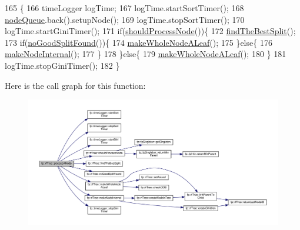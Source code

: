 \begin{DoxyCode}
165                                           \{
166                     timeLogger logTime;
167                     logTime.startSortTimer();
168                     \hyperlink{classfp_1_1rfTree_af72d0a2f930fd480dfb4858885c2df23}{nodeQueue}.back().setupNode();
169                     logTime.stopSortTimer();
170                     logTime.startGiniTimer();
171                     \textcolor{keywordflow}{if}(\hyperlink{classfp_1_1rfTree_a36abf82d31ca57670b09da16525dce0d}{shouldProcessNode}())\{
172                         \hyperlink{classfp_1_1rfTree_a51da8e4a46582b26643a4ae392230e77}{findTheBestSplit}();
173                         \textcolor{keywordflow}{if}(\hyperlink{classfp_1_1rfTree_a618bdc2d22267b4bb4f5e1881b1788f6}{noGoodSplitFound}())\{
174                             \hyperlink{classfp_1_1rfTree_a2b2a47186c0784415609f1c9b005e702}{makeWholeNodeALeaf}();
175                         \}\textcolor{keywordflow}{else}\{
176                             \hyperlink{classfp_1_1rfTree_aaf7bbdde5f7313c3e84853bbf5fdf792}{makeNodeInternal}();
177                         \}
178                     \}\textcolor{keywordflow}{else}\{
179                         \hyperlink{classfp_1_1rfTree_a2b2a47186c0784415609f1c9b005e702}{makeWholeNodeALeaf}();
180                     \}
181                     logTime.stopGiniTimer();
182                 \}
\end{DoxyCode}
Here is the call graph for this function\+:
\nopagebreak
\begin{figure}[H]
\begin{center}
\leavevmode
\includegraphics[width=350pt]{classfp_1_1rfTree_ab7760333f6857ab7ce2ee29a7bc16e65_cgraph}
\end{center}
\end{figure}
\mbox{\label{classfp_1_1rfTree_a7997df3477bc9f73163384c8cd0bcec9}} 
